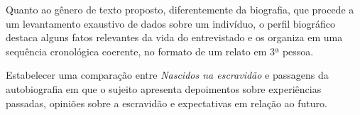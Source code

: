 \documentclass[11pt]{extarticle}
\begin{document}
Quanto ao gênero de texto proposto, diferentemente da biografia, que
procede a um levantamento exaustivo de dados sobre um indivíduo, o
perfil biográfico destaca alguns fatos relevantes da vida do
entrevistado e os organiza em uma sequência cronológica coerente, no
formato de um relato em 3ª pessoa.

Estabelecer uma comparação entre \emph{Nascidos na escravidão} e
passagens da autobiografia em que o sujeito apresenta depoimentos sobre
experiências passadas, opiniões sobre a escravidão e expectativas em
relação ao futuro.

\end{document}
